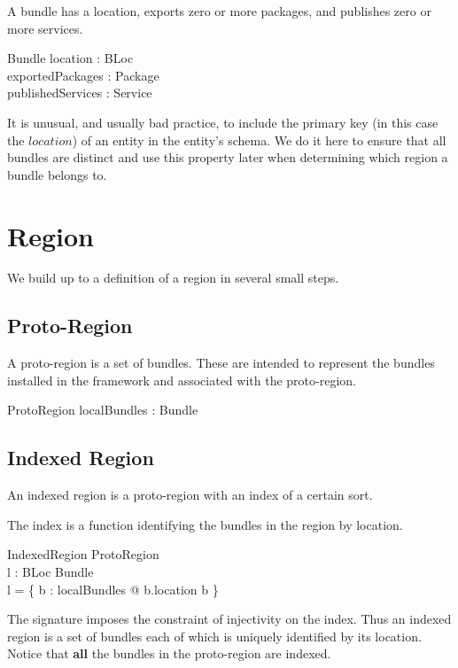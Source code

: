 \documentclass[a4paper,9pt,twoside]{article}
\begin{document}
A bundle has a location, exports zero or more packages, and publishes zero or more services.
\begin{schema}{Bundle}
  location : BLoc \\
  exportedPackages : \power Package \\
  publishedServices : \power Service \\
\end{schema}
It is unusual, and usually bad practice, to include the primary key (in this case the $location$) of
an entity in the entity's schema.
We do it here to ensure that all bundles are
distinct and use this property later when determining which region a bundle belongs to.

\clearpage
\section{Region}
\label{cha:region}

We build up to a definition of a region in several small steps.

\subsection{Proto-Region}

A proto-region is a set of bundles.
These are intended to represent the bundles installed in the framework and associated with the proto-region.
\begin{schema}{ProtoRegion}
  localBundles : \power Bundle \\
\end{schema}

\subsection{Indexed Region}

An indexed region is a proto-region with an index of a certain sort.

The index is a function identifying the bundles in the region by location.
\begin{schema}{IndexedRegion}
  ProtoRegion \\
  l : BLoc \pinj Bundle \\
\where
  l = \{ b : localBundles @ b.location \mapsto b \} \\
\end{schema}
The signature imposes the constraint of injectivity on the index.
Thus an indexed region is a set of bundles each of which is uniquely identified
by its location.
Notice that \textbf{all} the bundles in the proto-region are indexed.
\end{document}

